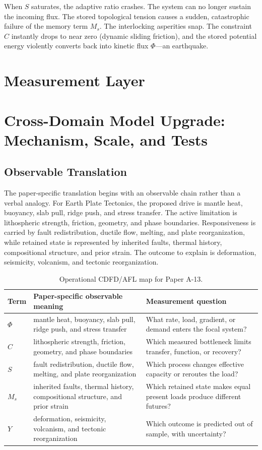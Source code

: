 \documentclass[11pt,a4paper]{article}
\begin{document}
When $S$ saturates, the adaptive ratio crashes. The system can no longer sustain the incoming flux. The stored topological tension causes a sudden, catastrophic failure of the memory term $M_s$. The interlocking asperities snap. The constraint $C$ instantly drops to near zero (dynamic sliding friction), and the stored potential energy violently converts back into kinetic flux $\Phi$---an earthquake.



\section{Measurement Layer}

\section{Cross-Domain Model Upgrade: Mechanism, Scale, and Tests}

\subsection{Observable Translation}

The paper-specific translation begins with an observable chain rather than a
verbal analogy. For Earth Plate Tectonics, the proposed drive is mantle heat, buoyancy, slab pull, ridge push, and stress transfer.
The active limitation is lithospheric strength, friction, geometry, and phase boundaries. Responsiveness is carried by
fault redistribution, ductile flow, melting, and plate reorganization, while retained state is represented by
inherited faults, thermal history, compositional structure, and prior strain. The outcome to explain is deformation, seismicity, volcanism, and tectonic reorganization.

\begin{table}[htbp]
\centering
\small
\caption{Operational CDFD/AFL map for Paper A-13.}
\begin{tabularx}{\textwidth}{|l|X|X|}
\hline
\textbf{Term} & \textbf{Paper-specific observable meaning} & \textbf{Measurement question} \\
\hline
$\Phi$ & mantle heat, buoyancy, slab pull, ridge push, and stress transfer & What rate, load, gradient, or demand enters the focal system? \\
\hline
$C$ & lithospheric strength, friction, geometry, and phase boundaries & Which measured bottleneck limits transfer, function, or recovery? \\
\hline
$S$ & fault redistribution, ductile flow, melting, and plate reorganization & Which process changes effective capacity or reroutes the load? \\
\hline
$M_s$ & inherited faults, thermal history, compositional structure, and prior strain & Which retained state makes equal present loads produce different futures? \\
\hline
$Y$ & deformation, seismicity, volcanism, and tectonic reorganization & Which outcome is predicted out of sample, with uncertainty? \\
\hline
\end{tabularx}
\end{table}
\end{document}

